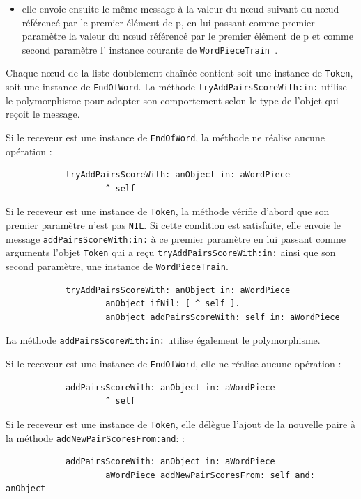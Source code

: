 \documentclass[12pt,a4paper]{report}
\begin{document}
\begin{enumerate}
\begin{enumerate}[label=\alph*)]
\begin{itemize}
	 		\item elle envoie ensuite le même message à la valeur du nœud suivant du nœud référencé par le premier élément de p, en lui passant comme premier paramètre la valeur du nœud référencé par le premier élément de p et comme second paramètre l' instance courante de \texttt{WordPieceTrain }.
	 	\end{itemize}
	 	
	 	Chaque nœud de la liste doublement chaînée contient soit une instance de \texttt{Token}, soit une instance de \texttt{EndOfWord}. La méthode \texttt{tryAddPairsScoreWith:in:} utilise le polymorphisme pour adapter son comportement selon le type de l'objet qui reçoit le message.
	 	
	 	Si le receveur est une instance de \texttt{EndOfWord}, la méthode ne réalise aucune opération :
	 	
	 	\begin{verbatim}
	 		tryAddPairsScoreWith: anObject in: aWordPiece
	 				^ self
	 	\end{verbatim}
	 	
	 	Si le receveur est une instance de \texttt{Token}, la méthode vérifie d'abord que son premier paramètre n'est pas \texttt{NIL}. Si cette condition est satisfaite, elle envoie le message \texttt{addPairsScoreWith:in:} à ce premier paramètre en lui passant comme arguments l'objet \texttt{Token} qui a reçu \texttt{tryAddPairsScoreWith:in:} ainsi que son second paramètre, une instance de \texttt{WordPieceTrain}.
	 	
	 	\begin{verbatim}
	 		tryAddPairsScoreWith: anObject in: aWordPiece
	 				anObject ifNil: [ ^ self ].
	 				anObject addPairsScoreWith: self in: aWordPiece
	 	\end{verbatim}
	 	
	 	La méthode \texttt{addPairsScoreWith:in:} utilise également le polymorphisme.
	 	
	 	Si le receveur est une instance de \texttt{EndOfWord}, elle ne réalise aucune opération :
	 	
	 	\begin{verbatim}
	 		addPairsScoreWith: anObject in: aWordPiece
	 				^ self
	 	\end{verbatim}
	 	
	 	Si le receveur est une instance de \texttt{Token}, elle délègue l'ajout de la nouvelle paire à la méthode \texttt{addNewPairScoresFrom:and}: :
	 	
	 	\begin{verbatim}
	 		addPairsScoreWith: anObject in: aWordPiece
	 				aWordPiece addNewPairScoresFrom: self and: anObject
	 	\end{verbatim}
	 	

\end{enumerate}
\end{enumerate}
\end{document}
